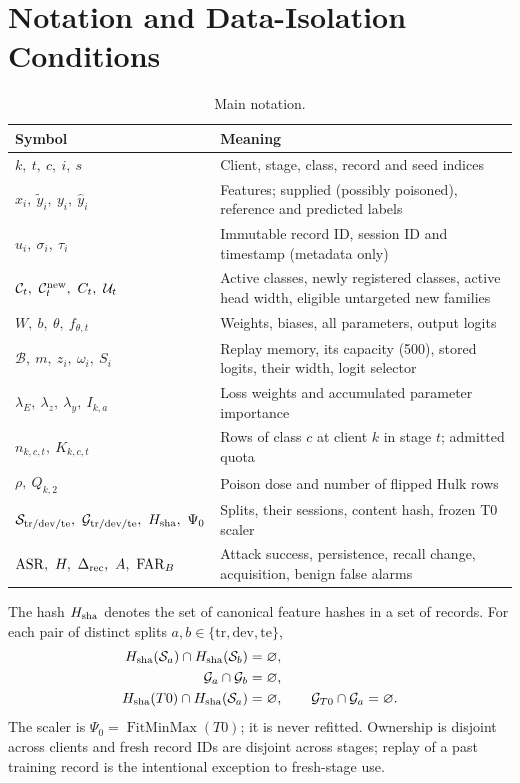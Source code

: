 \documentclass[10pt,a4paper]{article}
\begin{document}
\appendix
\section{Notation and Data-Isolation Conditions}
\label{app:notation}
\begin{table}[H]
\centering\footnotesize
\caption{Main notation.}
\label{tab:notation}
\begin{tabularx}{\linewidth}{L{4.6cm}Y}
\toprule
Symbol & Meaning\\
\midrule
$k,\ t,\ c,\ i,\ s$ & Client, stage, class, record and seed indices\\
$x_i,\ \widetilde y_i,\ y_i,\ \widehat y_i$ & Features; supplied (possibly poisoned), reference and predicted labels\\
$u_i,\ \sigma_i,\ \tau_i$ & Immutable record ID, session ID and timestamp (metadata only)\\
$\mathcal C_t,\ \mathcal C_t^{\rm new},\ C_t,\ \mathcal U_t$ & Active classes, newly registered classes, active head width, eligible untargeted new families\\
$W,\ b,\ \theta,\ f_{\theta,t}$ & Weights, biases, all parameters, output logits\\
$\mathcal B,\ m,\ z_i,\ \omega_i,\ S_i$ & Replay memory, its capacity (500), stored logits, their width, logit selector\\
$\lambda_E,\ \lambda_z,\ \lambda_y,\ I_{k,a}$ & Loss weights and accumulated parameter importance\\
$n_{k,c,t},\ K_{k,c,t}$ & Rows of class $c$ at client $k$ in stage $t$; admitted quota\\
$\rho,\ Q_{k,2}$ & Poison dose and number of flipped Hulk rows\\
$\mathcal S_{\rm tr/dev/te},\ \mathcal G_{\rm tr/dev/te},\ H_{\rm sha},\ \Psi_0$ & Splits, their sessions, content hash, frozen T0 scaler\\
$\mathrm{ASR},\ H,\ \Delta_{\rm rec},\ A,\ \mathrm{FAR}_B$ & Attack success, persistence, recall change, acquisition, benign false alarms\\
\bottomrule
\end{tabularx}
\end{table}
The hash $H_{\rm sha}$ denotes the set of canonical feature hashes in a set of records. For each pair of distinct splits $a,b\in\{\mathrm{tr},\mathrm{dev},\mathrm{te}\}$,
\begin{equation}
\begin{aligned}
H_{\rm sha}(\mathcal S_a)\cap H_{\rm sha}(\mathcal S_b)&=\varnothing,\\
\mathcal G_a\cap\mathcal G_b&=\varnothing,\\
H_{\rm sha}(T0)\cap H_{\rm sha}(\mathcal S_a)&=\varnothing,\qquad
\mathcal G_{T0}\cap\mathcal G_a=\varnothing.
\end{aligned}
\label{eq:isolation}
\end{equation}
The scaler is $\Psi_0=\operatorname{FitMinMax}(T0)$; it is never refitted. Ownership is disjoint across clients and fresh record IDs are disjoint across stages; replay of a past training record is the intentional exception to fresh-stage use.
\end{document}
